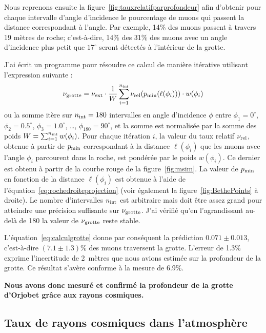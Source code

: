 \documentclass[a4paper, 12pt]{article}
\begin{document}
\begin{spacing}{1.5}
Nous reprenons ensuite la figure~\ref{fig:tauxrelatifparprofondeur} afin d'obtenir pour chaque intervalle d'angle d'incidence le pourcentage de muons qui passent la distance correspondant à l'angle. Par exemple, 14\% des muons passent à travers 19 mètres de roche; c'est-à-dire, 14\% des 31\% des muons avec un angle d'incidence plus petit que $17^\circ$ seront détectés à l'intérieur de la grotte. 

J'ai écrit un programme pour résoudre ce calcul de manière itérative utilisant l'expression suivante :
\begin{equation}
  \nu_{\rm grotte} = \nu_{\rm ext}\cdot \frac{1}{W}\sum_{i=1}^{n_{\rm int}}\nu_{\rm rel}(p_{\rm min}(\ell(\phi_i)))\cdot w(\phi_i)  
  \label{eq:calculgrotte}
\end{equation}
ou la somme itère sur $n_{\rm int}=180$ intervalles en angle d'incidence $\phi$ entre $\phi_1=0^\circ$, $\phi_2=0.5^\circ$, $\phi_3=1.0^\circ$, \dots, $\phi_{180}=90^\circ$, et la somme est normalisée par la somme des poids $W=\sum_{i=1}^{n_{\rm int}}w(\phi_i)$. Pour chaque itération $i$, la valeur du taux relatif $\nu_{\rm rel}$, obtenue à partir de $p_{\rm min}$ correspondant à la distance $\ell(\phi_i)$ que les muons avec l'angle $\phi_i$ parcourent dans la roche, est pondérée par le poids $w(\phi_i)$. Ce dernier est obtenu à partir de la courbe rouge de la figure~\ref{fig:msim}. La valeur de $p_{\rm min}$ en fonction de la distance $\ell(\phi_i)$ est obtenue à l'aide de l'équation~\ref{eq:rochedroiteprojection} (voir également la figure~\ref{fig:BethePoints} à droite). Le nombre d'intervalles $n_{\rm int}$ est arbitraire mais doit être assez grand pour atteindre une précision suffisante sur $\nu_{\rm grotte}$. J'ai vérifié qu'en l'agrandissant au-delà de 180 la valeur de $\nu_{\rm grotte}$ reste stable. 

L'équation~\ref{eq:calculgrotte} donne par conséquent la prédiction $0.071\pm0.013$, c'est-à-dire $(7.1\pm1.3)$\% des muons traversent la grotte. L'erreur de 1.3\% exprime l'incertitude de 2~mètres que nous avions estimée sur la profondeur de la grotte. Ce résultat s'avère conforme à la mesure de 6.9\%.

{\bf Nous avons donc mesuré et confirmé la profondeur de la grotte d'Orjobet grâce aux rayons cosmiques.}


\subsection{Taux de rayons cosmiques dans l'atmosphère}


\end{spacing}
\end{document}
